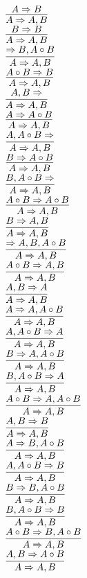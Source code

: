 \documentclass[11pt]{article}
\begin{document}
\begin{center}
\bigskip
\\$\infer{A\Rightarrow A, B}{A\Rightarrow B}$
\bigskip
\\$\infer{A\Rightarrow A, B}{B\Rightarrow B}$
\bigskip
\\$\infer{A\Rightarrow A, B}{\Rightarrow B, A\circ B}$
\bigskip
\\$\infer{A\Rightarrow A, B}{A\circ B\Rightarrow B}$
\bigskip
\\$\infer{A\Rightarrow A, B}{A, B\Rightarrow }$
\bigskip
\\$\infer{A\Rightarrow A, B}{A\Rightarrow A\circ B}$
\bigskip
\\$\infer{A\Rightarrow A, B}{A, A\circ B\Rightarrow }$
\bigskip
\\$\infer{A\Rightarrow A, B}{B\Rightarrow A\circ B}$
\bigskip
\\$\infer{A\Rightarrow A, B}{B, A\circ B\Rightarrow }$
\bigskip
\\$\infer{A\Rightarrow A, B}{A\circ B\Rightarrow A\circ B}$
\bigskip
\\$\infer{A\Rightarrow A, B}{B\Rightarrow A, B}$
\bigskip
\\$\infer{A\Rightarrow A, B}{\Rightarrow A, B, A\circ B}$
\bigskip
\\$\infer{A\Rightarrow A, B}{A\circ B\Rightarrow A, B}$
\bigskip
\\$\infer{A\Rightarrow A, B}{A, B\Rightarrow A}$
\bigskip
\\$\infer{A\Rightarrow A, B}{A\Rightarrow A, A\circ B}$
\bigskip
\\$\infer{A\Rightarrow A, B}{A, A\circ B\Rightarrow A}$
\bigskip
\\$\infer{A\Rightarrow A, B}{B\Rightarrow A, A\circ B}$
\bigskip
\\$\infer{A\Rightarrow A, B}{B, A\circ B\Rightarrow A}$
\bigskip
\\$\infer{A\Rightarrow A, B}{A\circ B\Rightarrow A, A\circ B}$
\bigskip
\\$\infer{A\Rightarrow A, B}{A, B\Rightarrow B}$
\bigskip
\\$\infer{A\Rightarrow A, B}{A\Rightarrow B, A\circ B}$
\bigskip
\\$\infer{A\Rightarrow A, B}{A, A\circ B\Rightarrow B}$
\bigskip
\\$\infer{A\Rightarrow A, B}{B\Rightarrow B, A\circ B}$
\bigskip
\\$\infer{A\Rightarrow A, B}{B, A\circ B\Rightarrow B}$
\bigskip
\\$\infer{A\Rightarrow A, B}{A\circ B\Rightarrow B, A\circ B}$
\bigskip
\\$\infer{A\Rightarrow A, B}{A, B\Rightarrow A\circ B}$

\end{center}
\end{document}
